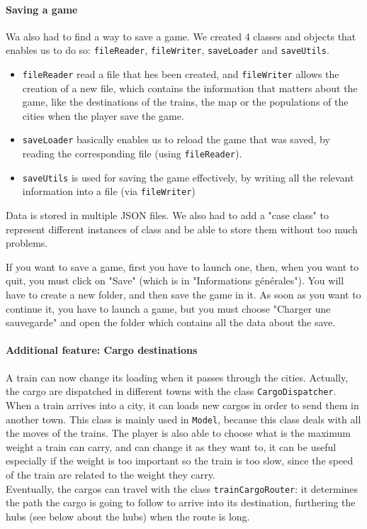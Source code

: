 \documentclass[a4paper]{article}
\begin{document}
	\paragraph{Saving a game} 
	Wa also had to find a way to save a game. We created 4 classes and objects that enables us to do so: \texttt{fileReader}, \texttt{fileWriter}, \texttt{saveLoader} and \texttt{saveUtils}.
	\begin{itemize}
		\item \texttt{fileReader} read a file that hes been created, and \texttt{fileWriter} allows the creation of a new file, which contains the information that matters about the game, like the destinations of the trains, the map or the populations of the cities when the player save the game.
		\item \texttt{saveLoader} basically enables us to reload the game that was saved, by reading the corresponding file (using \texttt{fileReader}).
		\item  \texttt{saveUtils} is used for saving the game effectively, by writing all the relevant information into a file (via \texttt{fileWriter})
	\end{itemize}
	Data is stored in multiple JSON files. We also had to add a "case class" to represent different instances of class and be able to store them without too much problems.
	
	If you want to save a game, first you have to launch one, then, when you want to quit, you must click on "Save" (which is in "Informations générales"). You will have to create a new folder, and then save the game in it.
	As soon as you want to continue it, you have to launch a game, but you must choose "Charger une sauvegarde" and open the folder which contains all the data about the save.

	\paragraph{Additional feature: Cargo destinations}
	A train can now change its loading when it passes through the cities. Actually, the cargo are dispatched in different towns with the class \texttt{CargoDispatcher}. When a train arrives into a city, it can loads new cargos in order to send them in another town. This class is mainly used in \texttt{Model}, because this class deals with all the moves of the trains. The player is also able to choose what is the maximum weight a train can carry, and can change it as they want to, it can be useful especially if the weight is too important so the train is too slow, since the speed of the train are related to the weight they carry.\\ Eventually, the cargos can travel with the class \texttt{trainCargoRouter}: it determines the path the cargo is going to follow to arrive into its destination, furthering the hubs (see below about the hubs) when the route is long.
	
\end{document}
